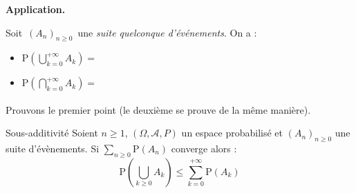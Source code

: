 \documentclass[french,11pt,twoside]{VcCours}
\renewcommand{\P}{\text{P}}
\begin{document}
%
%
 
\textbf{Application.}

Soit $\,(A_n)_{n \geq 0}\,$ une \emph{suite quelconque d'événements}. On a :
\begin{itemize}
\item $\P \left(\bigcup_{k=0}^{+\infty\ } A_k\right) = \phantom{
\lim_{n\to+\infty}\P\left(\bigcup\limits_{k=0}^{n} A_k\right) 
\quad}$ 
\item $\P \left(\bigcap_{k=0}^{+\infty\ } A_k\right) = 
\phantom{\lim\limits_{n\to+\infty}\!\!\P\left(\bigcap\limits_{k=0}^{n} A_k\right)} $
\end{itemize}


Prouvons le premier point (le deuxième se prouve de la même manière).

\vspace{7cm}


\begin{Theoreme}{Sous-additivité}
Soient $n \geq 1$, $(\Omega,\mathcal{A},P)$ un espace probabilisé et 
$(A_n)_{n \geq 0}$ une suite d'évènements. Si $\sum_{n \geq 0}\P(A_n)$ 
converge alors :
$$ \P \left(\bigcup_{k \geq 0} A_k \right) \leq \sum_{k=0}^{+ \infty} \P(A_k)$$
\end{Theoreme}
\end{document}
